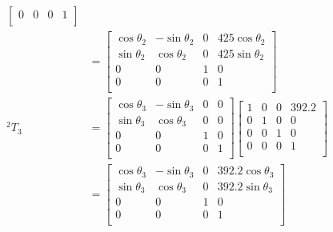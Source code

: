 \documentclass[UTF8, 12pt]{ctexart}
\begin{document}
\[\begin{aligned}
\begin{bmatrix}
        0 & 0 & 0 & 1 \\
        \end{bmatrix} \\
        &= \begin{bmatrix}
        \cos\theta_2 & -\sin\theta_2 & 0 & 425\cos\theta_2 \\
        \sin\theta_2 & \cos\theta_2 & 0 & 425\sin\theta_2 \\
        0 & 0 & 1 & 0 \\
        0 & 0 & 0 & 1 \\
        \end{bmatrix} \\[1em]
{}^2T_3 &= \begin{bmatrix}
        \cos\theta_3 & -\sin\theta_3 & 0 & 0 \\
        \sin\theta_3 & \cos\theta_3 & 0 & 0 \\
        0 & 0 & 1 & 0 \\
        0 & 0 & 0 & 1 \\
        \end{bmatrix}
        \begin{bmatrix}
        1 & 0 & 0 & 392.2 \\
        0 & 1 & 0 & 0 \\
        0 & 0 & 1 & 0 \\
        0 & 0 & 0 & 1 \\
        \end{bmatrix} \\
        &= \begin{bmatrix}
        \cos\theta_3 & -\sin\theta_3 & 0 & 392.2\cos\theta_3 \\
        \sin\theta_3 & \cos\theta_3 & 0 & 392.2\sin\theta_3 \\
        0 & 0 & 1 & 0 \\
        0 & 0 & 0 & 1 \\
        \end{bmatrix} \\
\end{aligned}
\]
\end{document}
